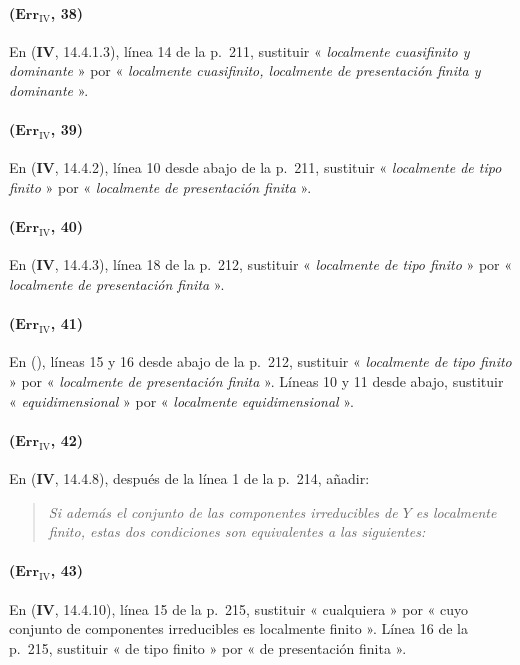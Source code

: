 \paragraph{($\mathbf{Err}_{\mathrm{IV}}$, 38)}
En (\textbf{IV}, 14.4.1.3), línea 14 de la p.~211, sustituir « \emph{localmente cuasifinito y dominante} » por « \emph{localmente cuasifinito, localmente de presentación finita y dominante} ».

\paragraph{($\mathbf{Err}_{\mathrm{IV}}$, 39)}
En (\textbf{IV}, 14.4.2), línea 10 desde abajo de la p.~211, sustituir « \emph{localmente de tipo finito} » por « \emph{localmente de presentación finita} ».

\paragraph{($\mathbf{Err}_{\mathrm{IV}}$, 40)}
En (\textbf{IV}, 14.4.3), línea 18 de la p.~212, sustituir « \emph{localmente de tipo finito} » por « \emph{localmente de presentación finita} ».

\paragraph{($\mathbf{Err}_{\mathrm{IV}}$, 41)}
En ({}), líneas 15 y 16 desde
abajo de la p.~212, sustituir « \emph{localmente de tipo finito} » por
« \emph{localmente de presentación finita} ». Líneas 10 y 11 desde abajo, sustituir
« \emph{equidimensional} » por « \emph{localmente equidimensional} ».

\paragraph{($\mathbf{Err}_{\mathrm{IV}}$, 42)}
En (\textbf{IV}, 14.4.8), después de la línea 1 de la p.~214, añadir:
\begin{quote}
\emph{Si además el conjunto de las componentes irreducibles de $Y$ es
localmente finito, estas dos condiciones son equivalentes a las siguientes:}
\end{quote}

\paragraph{($\mathbf{Err}_{\mathrm{IV}}$, 43)}
En (\textbf{IV}, 14.4.10), línea 15 de la p.~215, sustituir « cualquiera » por
« cuyo conjunto de componentes irreducibles es localmente finito ».
Línea 16 de la p.~215, sustituir « de tipo finito » por « de presentación finita ».

